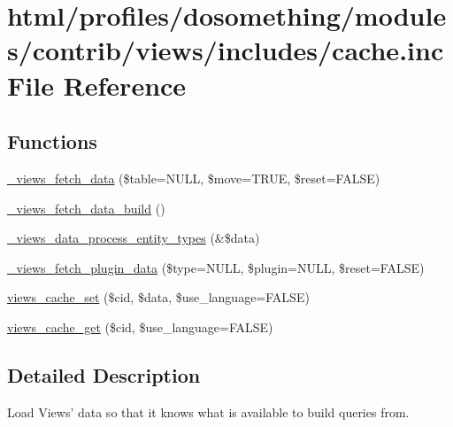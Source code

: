 \hypertarget{views_2includes_2cache_8inc}{
\section{html/profiles/dosomething/modules/contrib/views/includes/cache.inc File Reference}
\label{views_2includes_2cache_8inc}
}
\subsection*{Functions}
\begin{DoxyCompactItemize}
\item 
\hyperlink{views_2includes_2cache_8inc_a367769ad7eed921c7796b27dffb5e60a}{\_\-views\_\-fetch\_\-data} (\$table=NULL, \$move=TRUE, \$reset=FALSE)
\item 
\hyperlink{views_2includes_2cache_8inc_ab32ccf6a813b8037d2552ed0d54125f9}{\_\-views\_\-fetch\_\-data\_\-build} ()
\item 
\hyperlink{views_2includes_2cache_8inc_ab785ab7dc065d39a7789b7f98a701153}{\_\-views\_\-data\_\-process\_\-entity\_\-types} (\&\$data)
\item 
\hyperlink{views_2includes_2cache_8inc_a70217d418b60499c49aaa469712a8501}{\_\-views\_\-fetch\_\-plugin\_\-data} (\$type=NULL, \$plugin=NULL, \$reset=FALSE)
\item 
\hyperlink{views_2includes_2cache_8inc_a40508277eb295523eb45a067c8a84324}{views\_\-cache\_\-set} (\$cid, \$data, \$use\_\-language=FALSE)
\item 
\hyperlink{views_2includes_2cache_8inc_a3d4e5b21bcf4c7cc327190ece3251555}{views\_\-cache\_\-get} (\$cid, \$use\_\-language=FALSE)
\end{DoxyCompactItemize}


\subsection{Detailed Description}
Load Views' data so that it knows what is available to build queries from. 

